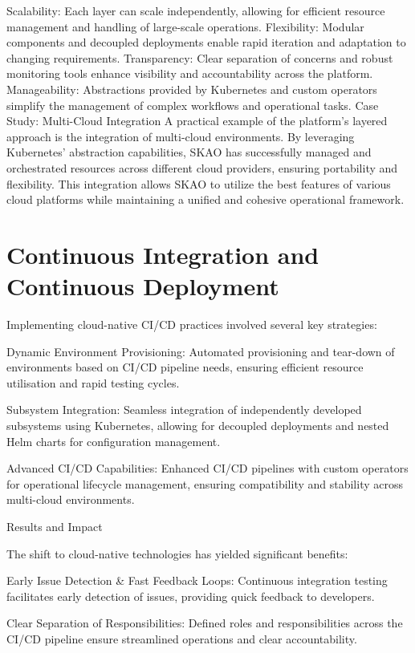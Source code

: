 \documentclass[a4paper]{spie}  %
\begin{document}
Scalability: Each layer can scale independently, allowing for efficient resource management and handling of large-scale operations.
Flexibility: Modular components and decoupled deployments enable rapid iteration and adaptation to changing requirements.
Transparency: Clear separation of concerns and robust monitoring tools enhance visibility and accountability across the platform.
Manageability: Abstractions provided by Kubernetes and custom operators simplify the management of complex workflows and operational tasks.
Case Study: Multi-Cloud Integration
A practical example of the platform's layered approach is the integration of multi-cloud environments. By leveraging Kubernetes' abstraction capabilities, SKAO has successfully managed and orchestrated resources across different cloud providers, ensuring portability and flexibility. This integration allows SKAO to utilize the best features of various cloud platforms while maintaining a unified and cohesive operational framework.

\section{Continuous Integration and Continuous Deployment}

Implementing cloud-native CI/CD practices involved several key strategies:

Dynamic Environment Provisioning: Automated provisioning and tear-down of environments based on CI/CD pipeline needs, ensuring efficient resource utilisation and rapid testing cycles.

Subsystem Integration: Seamless integration of independently developed subsystems using Kubernetes, allowing for decoupled deployments and nested Helm charts for configuration management.

Advanced CI/CD Capabilities: Enhanced CI/CD pipelines with custom operators for operational lifecycle management, ensuring compatibility and stability across multi-cloud environments.

Results and Impact

The shift to cloud-native technologies has yielded significant benefits:

Early Issue Detection \& Fast Feedback Loops: Continuous integration testing facilitates early detection of issues, providing quick feedback to developers.

Clear Separation of Responsibilities: Defined roles and responsibilities across the CI/CD pipeline ensure streamlined operations and clear accountability.
\end{document}
